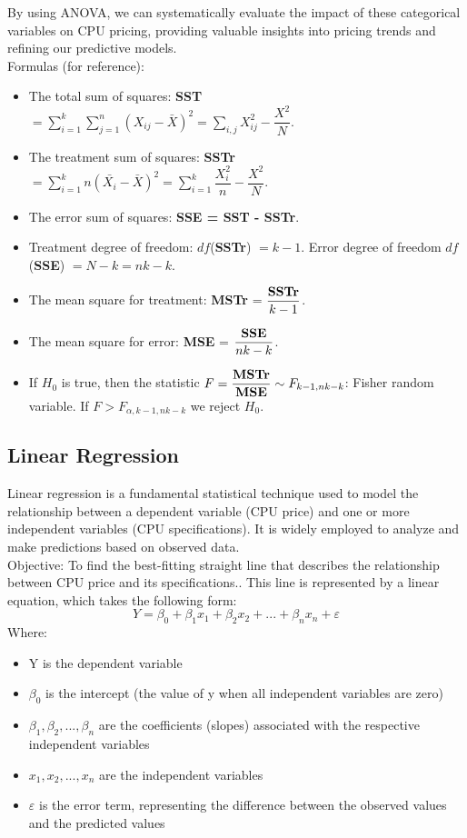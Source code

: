 By using ANOVA, we can systematically evaluate the impact of these categorical variables on CPU pricing, providing valuable insights into pricing trends and refining our predictive models.\\

Formulas (for reference):
\begin{itemize}
\item The total sum of squares: \textbf{SST} $ = \sum_{i=1}^{k}\sum_{j = 1}^{n} (X_{ij} - \bar{X})^2 = \sum_{i,j}X^2_{ij} - \dfrac{X^2}{N} $.
\item The treatment sum of squares: \textbf{SSTr} $ = \sum_{i=1}^{k} n (\bar{X_i} - \bar{X})^2 = \sum_{i=1}^{k} \dfrac{X_i^2}{n} - \dfrac{X^2}{N} $.
\item The error sum of squares: \textbf{SSE = SST - SSTr}.
\item Treatment degree of freedom: $df$(\textbf{SSTr}) $= k-1$. Error degree of freedom $df$(\textbf{SSE}) $= N-k = nk-k$.
\item The mean square for treatment: \textbf{MSTr} = $ \dfrac{\text{\textbf{SSTr}}}{k-1} $.
\item The mean square for error: \textbf{MSE} = $ \dfrac{\text{\textbf{SSE}}}{nk-k} $.
\item If $H_0$ is true, then the statistic $F = \dfrac{\text{\textbf{MSTr}}}{\text{\textbf{MSE}}} \sim F_{k-1,nk-k}$: Fisher random variable. If $ F > F_{\alpha, k-1, nk-k} $ we reject $H_0$.
\end{itemize}

\subsection{Linear Regression}
Linear regression is a fundamental statistical technique used to model the relationship between a dependent variable (CPU price) and one or more independent variables (CPU specifications). It is widely employed to analyze and make predictions based on observed data.\\

Objective: To find the best-fitting straight line that describes the relationship between CPU price and its specifications.. This line is represented by a linear equation, which takes the following form:\\
$$ Y = \beta_0 + \beta_1x_1 + \beta_2x_2 + ... + \beta_nx_n + \varepsilon  $$
Where:
\begin{itemize}
    \item Y is the dependent variable
    \item $ \beta_0 $ is the intercept (the value of y when all independent variables are zero)
    \item $ \beta_1,  \beta_2, ...,  \beta_n$ are the coefficients (slopes) associated with the respective independent variables
    \item $x_1, x_2, ..., x_n$ are the independent variables
    \item $\varepsilon$ is the error term, representing the difference between the observed values and the predicted values
\end{itemize}

